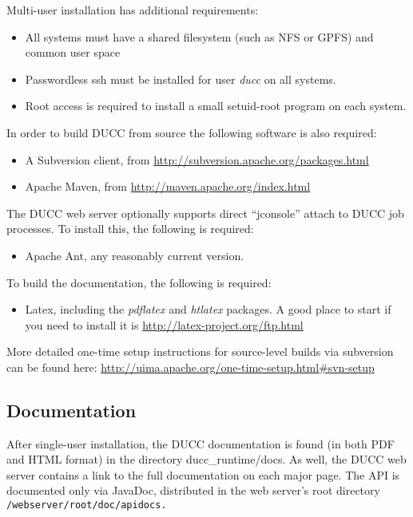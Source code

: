 Multi-user installation has additional requirements:

\begin{itemize}
  \item All systems must have a shared filesystem (such as NFS or GPFS)  and common user space 
  \item Passwordless ssh must be installed for user {\em ducc} on all systems.
  \item Root access is required to install a small setuid-root program on each system.
\end{itemize}
  
In order to build DUCC from source the following software is also required:
\begin{itemize}
    \item A Subversion client, from \url{http://subversion.apache.org/packages.html}
    \item Apache Maven, from \url{http://maven.apache.org/index.html}
\end{itemize}

The DUCC web server optionally supports direct ``jconsole'' attach to DUCC job processes.  To install
this, the following is required:
\begin{itemize}
    \item Apache Ant, any reasonably current version.
\end{itemize}
    
To build the documentation, the following is required:
\begin{itemize}
  \item Latex, including the \emph{pdflatex} and \emph{htlatex} packages.  A good place
    to start if you need to install it is \url{http://latex-project.org/ftp.html}
\end{itemize}

More detailed one-time setup instructions for source-level builds via subversion can be found here:
\url{http://uima.apache.org/one-time-setup.html\#svn-setup}

\subsection{Documentation}
After single-user installation, the DUCC documentation is found (in both PDF and HTML format) in the directory 
ducc\_runtime/docs.  As well, the DUCC web server contains a link to the full documentation on each major page.
The API is documented only via JavaDoc, distributed in the web server's root directory 
{\tt \duccruntime/webserver/root/doc/apidocs.}  

